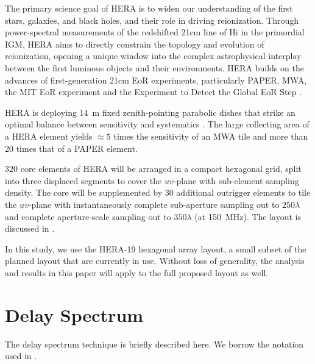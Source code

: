 \documentclass[preprint2,iop,numberedappendix,twocolappendix,appendixfloats]{emulateapj}
\begin{document}
The primary science goal of HERA is to widen our understanding of the first stars, galaxies, and black holes, and their role in driving reionization. Through power-spectral measurements of the redshifted 21cm line of H{\sc i} in the primordial IGM, HERA aims to directly constrain the topology and evolution of reionization, opening a unique window into the complex astrophysical interplay between the first luminous objects and their environments. HERA builds on the advances of first-generation 21cm EoR experiments, particularly PAPER, MWA, the MIT EoR experiment \citep[MITEoR;][]{zhe14} and the Experiment to Detect the Global EoR Step \citep[EDGES;][]{bow10}.

HERA is deploying 14~m fixed zenith-pointing parabolic dishes that strike an optimal balance between sensitivity and systematics \citep[][and this paper]{ewa16,neb16,pat16}. The large collecting area of a HERA element yields $\approx 5$ times the sensitivity of an MWA tile and more than 20 times that of a PAPER element. 

320 core elements of HERA will be arranged in a compact hexagonal grid, split into three displaced segments to cover the $uv$-plane with sub-element sampling density. The core will be supplemented by 30 additional outrigger elements to tile the $uv$-plane with instantaneously complete sub-aperture sampling out to $250\lambda$ and complete aperture-scale sampling out to $350\lambda$ (at 150~MHz). The layout is discussed in \citet{dil16}.

In this study, we use the HERA-19 hexagonal array layout, a small subset of the planned layout that are currently in use. Without loss of generality, the analysis and results in this paper will apply to the full proposed layout as well.

\section{Delay Spectrum}\label{sec:delay-spectrum}

The delay spectrum technique \citep{par12a,par12b} is briefly described here. We borrow the notation used in \citet{thy15a}. 
\end{document}
